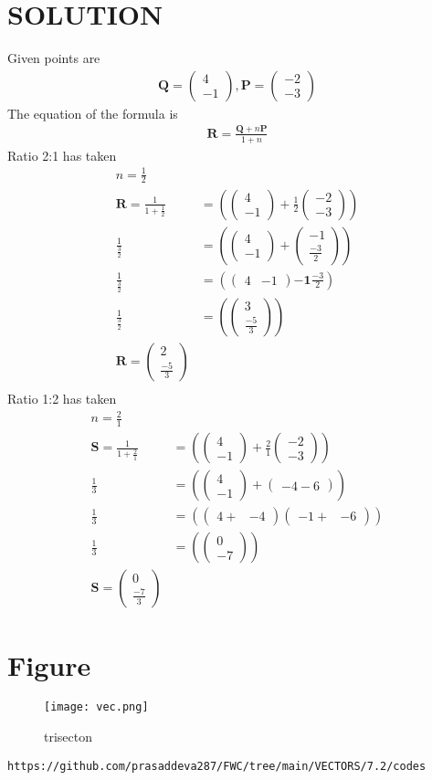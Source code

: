 \documentclass[12pt]{article}
\providecommand{\brak}[1]{\ensuremath{\left(#1\right)}}
\newcommand{\myvec}[1]{\ensuremath{\begin{pmatrix}#1\end{pmatrix}}}
\let\vec\mathbf
\begin{document}
\section{SOLUTION}
Given points are
\begin{align}
\vec{Q}=\myvec{4\\ -1} ,
\vec{P}=\myvec{-2\\ -3}
\end{align}
The equation of the formula is
\begin{align}
\vec{R}=\frac{\vec{Q}+n\vec{P}}{1+n}
\end{align}
Ratio 2:1 has taken 
\begin{align}
n=\frac{1}{2}\\
\vec{R}=\frac{1}{1+\frac{1}{2}}&=\brak{\myvec{4\\-1}+\frac{1}{2}\myvec{-2\\-3}}\\
\frac{1}{\frac{3}{2}}&=\brak{\myvec{4\\ -1}+\myvec{-1\\ \frac{-3}{2}}}\\
\frac{1}{\frac{3}{2}}&=\brak {\myvec{4&-1} {\vec{-1} \frac{-3}{2}}}\\
\frac{1}{\frac{3}{2}}&=\brak {\myvec{3\\ \frac{-5}{3}}}\\
\vec{R}=\myvec{2\\ \frac{-5}{3}}\\
\end{align}
Ratio 1:2 has taken
\begin{align}
n=\frac{2}{1}\\
\vec{S}=\frac{1}{1+\frac{2}{1}}&=\brak{\myvec{4\\-1}+\frac{2}{1}\myvec{-2\\-3}}\\
\frac{1}{3}&=\brak{\myvec{4\\ -1}+\myvec{-4-6}}\\
\frac{1}{3}&=\brak{\myvec{4+& -4}\myvec{-1+&-6}}\\
\frac{1}{3}&=\brak{\myvec{0\\ -7}}\\
\vec{S}=\myvec{0\\ \frac{-7}{3}}
\end{align}
\section{Figure}
\begin{figure}[h]
\centering
\texttt{[image: vec.png]}
\caption{trisecton}
		\label{fig:Figure}
\end{figure}
\begin{lstlisting}
https://github.com/prasaddeva287/FWC/tree/main/VECTORS/7.2/codes
\end{lstlisting}
\end{document}
